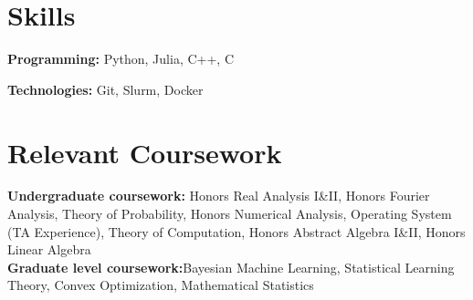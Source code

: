 \documentclass[letterpaper,11pt]{article}
\newcommand{\resumeSubHeadingListStart}{\begin{itemize}[leftmargin=0.15in, label={}]}
\newcommand{\resumeSubHeadingListEnd}{\end{itemize}}
\begin{document}

\section{Skills}
  \vspace{2pt}
  \resumeSubHeadingListStart
    \small{\item{
        \textbf{Programming:}{ Python, Julia, C++, C} \\ \vspace{3pt}
        
        \textbf{Technologies:}{ Git, Slurm, Docker } \\ \vspace{3pt}
        
    }}
  \resumeSubHeadingListEnd




\section{Relevant Coursework}
  \vspace{2pt}
  \resumeSubHeadingListStart
    \small{\item{
        \textbf{Undergraduate coursework:}{ Honors Real Analysis I\&II, Honors Fourier Analysis, Theory of Probability, Honors Numerical Analysis, Operating System (TA Experience), Theory of Computation, Honors Abstract Algebra I\&II, Honors Linear Algebra} \vspace{3pt}\\ 

        \textbf{Graduate level coursework:}{Bayesian Machine Learning, Statistical Learning Theory, Convex Optimization, Mathematical Statistics}
        
    }}
  \resumeSubHeadingListEnd




    
\end{document}
